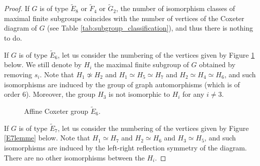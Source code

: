\documentclass[a4paper, 11pt]{amsart}
\theoremstyle{definition}
\theoremstyle{remark}
\begin{document}
\begin{proof}
\smallskip

If $G$ is of type $\tilde{E}_8$ or $\tilde{F}_4$ or $\tilde{G}_2$, the number of isomorphism classes of maximal finite subgroups coincides with the number of vertices of the Coxeter diagram of $G$ (see Table \ref{tab:subgroup_classification}), and thus there is nothing to do. 

\smallskip

If $G$ is of type $\tilde{E}_6$, let us consider the numbering of the vertices given by Figure \ref{E6lemme} below. We still denote by $H_i$ the maximal finite subgroup of $G$ obtained by removing $s_i$. Note that $H_1\not\simeq H_2$ and $H_1\simeq H_5\simeq H_7$ and $H_2\simeq H_4\simeq H_6$, and such isomorphisms are induced by the group of graph automorphisms (which is of order 6). Moreover, the group $H_3$ is not isomorphic to $H_i$ for any $i\neq 3$.

\begin{figure}[h!]
  \centering
  \caption{Affine Coxeter group $\tilde{E}_6$.}
  \label{E6lemme}
\end{figure}

\smallskip

If $G$ is of type $\tilde{E}_7$, let us consider the numbering of the vertices given by Figure \ref{E7lemme} below. Note that $H_1\simeq H_7$ and $H_2\simeq H_6$ and $H_3\simeq H_5$, and such isomorphisms are induced by the left-right reflection symmetry of the diagram. There are no other isomorphisms between the $H_i$.



\end{proof}
\end{document}

